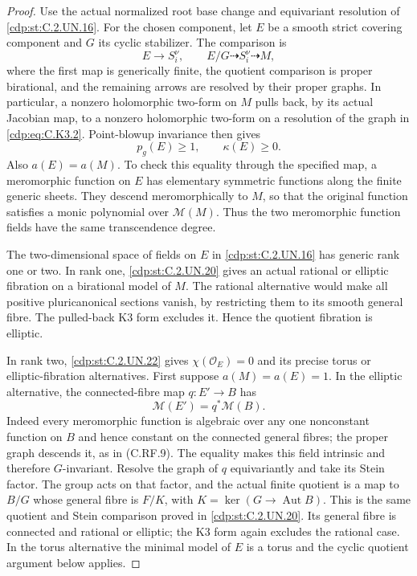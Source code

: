 \begin{proof}
Use the actual normalized root base change and equivariant
resolution of \ref{cdp:st:C.2.UN.16}. For the chosen component, let $E$
be a smooth strict covering component and $G$ its cyclic
stabilizer. The comparison is
\[
 E\longrightarrow S_i^\nu,
 \qquad E/G\dashrightarrow S_i^\nu\dashrightarrow M,
                                                               \tag{C.K3.2}\label{cdp:eq:C.K3.2}
\]
where the first map is generically finite, the quotient
comparison is proper birational, and the remaining arrows
are resolved by their proper graphs. In particular, a
nonzero holomorphic two-form on $M$ pulls back, by its
actual Jacobian map, to a nonzero holomorphic two-form on
a resolution of the graph in \eqref{cdp:eq:C.K3.2}. Point-blowup
invariance then gives
\[
                  p_g(E)\ge1,\qquad \kappa(E)\ge0.
                                                               \tag{C.K3.3}\label{cdp:eq:C.K3.3}
\]
Also $a(E)=a(M)$. To check this equality through the
specified map, a meromorphic function on $E$ has elementary
symmetric functions along the finite generic sheets.
They descend meromorphically to $M$, so that the original
function satisfies a monic polynomial over $\mathcal M(M)$.
Thus the two meromorphic function fields have the same
transcendence degree.

The two-dimensional space of fields on $E$ in \ref{cdp:st:C.2.UN.16}
has generic rank one or two. In rank one, \ref{cdp:st:C.2.UN.20} gives
an actual rational or elliptic fibration on a birational
model of $M$. The rational alternative would make all
positive pluricanonical sections vanish, by restricting
them to its smooth general fibre. The pulled-back K3
form excludes it. Hence the quotient fibration is elliptic.

In rank two, \ref{cdp:st:C.2.UN.22} gives $\chi(\mathcal O_E)=0$ and
its precise torus or elliptic-fibration alternatives.
First suppose $a(M)=a(E)=1$. In the elliptic alternative,
the connected-fibre map $q:E'\to B$ has
\[
                     \mathcal M(E')=q^*\mathcal M(B).
                                                               \tag{C.K3.4}\label{cdp:eq:C.K3.4}
\]
Indeed every meromorphic function is algebraic over any
one nonconstant function on $B$ and hence constant on
the connected general fibres; the proper graph descends
it, as in (C.RF.9). The equality makes this field
intrinsic and therefore $G$-invariant. Resolve the graph
of $q$ equivariantly and take its Stein factor. The group
acts on that factor, and the actual finite quotient is a
map to $B/G$ whose general fibre is $F/K$, with
$K=\ker(G\to\operatorname{Aut}B)$. This is the same
quotient and Stein comparison proved in \ref{cdp:st:C.2.UN.20}.
Its general fibre is connected and rational or elliptic;
the K3 form again excludes the rational case. In the
torus alternative the minimal model of $E$ is a torus
and the cyclic quotient argument below applies.


\end{proof}
